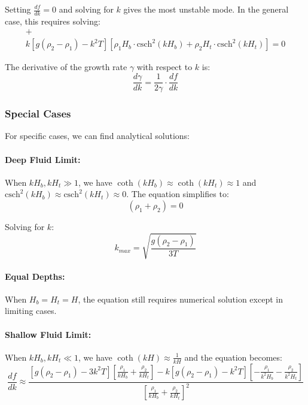 \documentclass[12pt,a4paper]{article}
\begin{document}
Setting $\frac{df}{dk} = 0$ and solving for $k$ gives the most unstable mode. In the general case, this requires solving:
\begin{multline}
[g(\rho_2 - \rho_1) - 3k^2T][\rho_1\coth(kH_b) + \rho_2\coth(kH_t)] + \\
k[g(\rho_2 - \rho_1) - k^2T][\rho_1 H_b \cdot \text{csch}^2(kH_b) + \rho_2 H_t \cdot \text{csch}^2(kH_t)] = 0
\end{multline}

The derivative of the growth rate $\gamma$ with respect to $k$ is:
\begin{equation}
\frac{d\gamma}{dk} = \frac{1}{2\gamma} \cdot \frac{df}{dk}
\end{equation}

\subsubsection{Special Cases}
For specific cases, we can find analytical solutions:

\paragraph{Deep Fluid Limit:} When $kH_b, kH_t \gg 1$, we have $\coth(kH_b) \approx \coth(kH_t) \approx 1$ and $\text{csch}^2(kH_b) \approx \text{csch}^2(kH_t) \approx 0$. The equation simplifies to:
\begin{equation}
[g(\rho_2 - \rho_1) - 3k^2T](\rho_1 + \rho_2) = 0
\end{equation}

Solving for $k$:
\begin{equation}
k_{max} = \sqrt{\frac{g(\rho_2 - \rho_1)}{3T}}
\end{equation}

\paragraph{Equal Depths:} When $H_b = H_t = H$, the equation still requires numerical solution except in limiting cases.

\paragraph{Shallow Fluid Limit:} When $kH_b, kH_t \ll 1$, we have $\coth(kH) \approx \frac{1}{kH}$ and the equation becomes:
\begin{equation}
\frac{df}{dk} \approx \frac{[g(\rho_2 - \rho_1) - 3k^2T][\frac{\rho_1}{kH_b} + \frac{\rho_2}{kH_t}] - k[g(\rho_2 - \rho_1) - k^2T][-\frac{\rho_1}{k^2H_b} - \frac{\rho_2}{k^2H_t}]}{[\frac{\rho_1}{kH_b} + \frac{\rho_2}{kH_t}]^2}
\end{equation}
\end{document}
